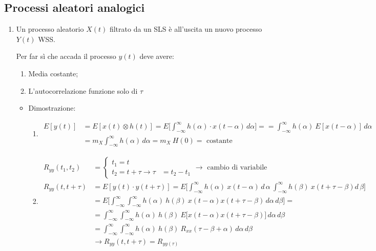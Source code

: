 \documentclass[
]{article}
\providecommand{\tightlist}{%
  \setlength{\itemsep}{0pt}\setlength{\parskip}{0pt}}
\begin{document}
\subsection{Processi aleatori
analogici}\label{processi-aleatori-analogici}

\begin{enumerate}
\def\labelenumi{\arabic{enumi}.}
\item
  Un processo aleatorio \(X(t)\) filtrato da un SLS è all'uscita un
  nuovo processo \(Y(t)\) WSS.

  Per far sì che accada il processo \(y(t)\) deve avere:

  \begin{enumerate}
  \def\labelenumii{\arabic{enumii}.}
  \tightlist
  \item
    Media costante;
  \item
    L'autocorrelazione funzione solo di \(\tau\)
  \end{enumerate}

  \begin{itemize}
  \tightlist
  \item
    Dimostrazione:

    \begin{enumerate}
    \def\labelenumii{\arabic{enumii}.}
    \tightlist
    \item
      \begin{align*}
       E[y(t)]&= E[x(t)\otimes h(t)]= E\Big[\int_{-\infty}^{\infty} h(\alpha)\cdot x(t-\alpha) \,d\alpha\Big] =
       =\int_{-\infty}^{\infty} h(\alpha) \ E[x(t-\alpha)] \,d\alpha \\ &= m_{X} \int_{-\infty}^{\infty} h(\alpha) \,d\alpha = m_{X} \ H(0) =  \text{ costante}
       \end{align*}
    \item
      \begin{align*}
       R_{yy}(t_{1},t_{2}) &= \left\{ \begin{array}{lcl}
       t_{1} =t \\
       t_{2} = t + \tau \to \tau &= t_{2}-t_{1}
       \end{array} \right. \to \text{ cambio di variabile} \\
       R_{yy}(t, t + \tau) &= E[y(t)\cdot y(t+\tau)] = E\Big[\int_{-\infty}^{\infty} h(\alpha) \ x(t-\alpha)\,d\,\alpha \ \int_{-\infty}^{\infty}h(\beta) \ x(t+\tau -\beta) d\,\beta\Big]\\
       &=E\Big[\int_{-\infty}^{\infty}\int_{-\infty}^{\infty} h(\alpha) \ h(\beta) \ x(t-\alpha) x(t+\tau -\beta) \,d\alpha \,d\beta \Big]= \\
       &=\int_{-\infty}^{\infty}\int_{-\infty}^{\infty} h(\alpha) \ h(\beta) \ E \Big[x(t-\alpha) x(t+\tau -\beta) \Big] \,d\alpha \,d\beta \\
       &=\int_{-\infty}^{\infty}\int_{-\infty}^{\infty} h(\alpha) \ h(\beta) \ R_{xx}(\tau -\beta +\alpha) \,d\alpha \,d\beta \\&\to R_{yy}(t, t+\tau) = R_{yy(\tau)}
       \end{align*}
    \end{enumerate}


\end{itemize}
\end{enumerate}
\end{document}
